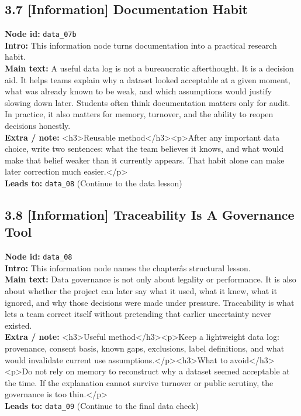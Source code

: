 \documentclass[11pt]{article}
\begin{document}
\subsection*{3.7 [Information] Documentation Habit}
\textbf{Node id:} \texttt{data\_07b}\\
\textbf{Intro:} This information node turns documentation into a practical research habit.\\
\textbf{Main text:} A useful data log is not a bureaucratic afterthought. It is a decision aid. It helps teams explain why a dataset looked acceptable at a given moment, what was already known to be weak, and which assumptions would justify slowing down later. Students often think documentation matters only for audit. In practice, it also matters for memory, turnover, and the ability to reopen decisions honestly.\\
\textbf{Extra / note:} <h3>Reusable method</h3><p>After any important data choice, write two sentences: what the team believes it knows, and what would make that belief weaker than it currently appears. That habit alone can make later correction much easier.</p>\\
\textbf{Leads to:} \texttt{data\_08} (Continue to the data lesson)\\
\subsection*{3.8 [Information] Traceability Is A Governance Tool}
\textbf{Node id:} \texttt{data\_08}\\
\textbf{Intro:} This information node names the chapterâs structural lesson.\\
\textbf{Main text:} Data governance is not only about legality or performance. It is also about whether the project can later say what it used, what it knew, what it ignored, and why those decisions were made under pressure. Traceability is what lets a team correct itself without pretending that earlier uncertainty never existed.\\
\textbf{Extra / note:} <h3>Useful method</h3><p>Keep a lightweight data log: provenance, consent basis, known gaps, exclusions, label definitions, and what would invalidate current use assumptions.</p><h3>What to avoid</h3><p>Do not rely on memory to reconstruct why a dataset seemed acceptable at the time. If the explanation cannot survive turnover or public scrutiny, the governance is too thin.</p>\\
\textbf{Leads to:} \texttt{data\_09} (Continue to the final data check)\\
\end{document}
